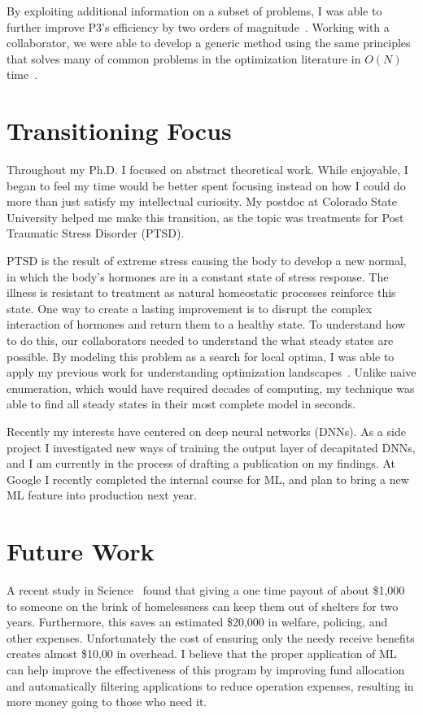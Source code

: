 \documentclass[a4paper, 11pt]{article}
\begin{document}
By exploiting additional information on a subset of problems, I was able to further
improve P3's efficiency by two orders of magnitude~\cite{goldman:2015:GBO}.
Working with a collaborator, we were able to develop a generic method using the same principles
that solves many of common problems in the optimization literature in $O(N)$ time~\cite{whitley:2016:mkl}.

\section{Transitioning Focus}
Throughout my Ph.D. I focused on abstract theoretical work. While enjoyable, I began to feel my time would be
better spent focusing instead on how I could do more than just satisfy my intellectual curiosity.
My postdoc at Colorado State University helped me make this transition, as the topic was treatments for
Post Traumatic Stress Disorder (PTSD).

PTSD is the result of extreme stress causing the body to develop a new
normal, in which the body's hormones are in a constant state of stress response. The illness is resistant
to treatment as natural homeostatic processes reinforce this state. One way to create a lasting improvement
is to disrupt the complex interaction of hormones and return them to a healthy state. To understand how to
do this, our collaborators needed to understand the what steady states are possible. By modeling this problem as a search for local optima,
I was able to apply my previous work for understanding optimization landscapes~\cite{goldman:2016:hyperplane}.
Unlike naive enumeration, which would have required decades of computing, my technique was able to find
all steady states in their most complete model in seconds.


Recently my interests have centered on deep neural networks (DNNs). As a side project I
investigated new ways of training the output layer of decapitated DNNs, and I am currently in the
process of drafting a publication on my findings. At Google I recently completed the internal course
for ML, and plan to bring a new ML feature into production next year.

\section{Future Work}
A recent study in Science~\cite{evans:2016:homelessness} found that
giving a one time payout of about \$1,000 to someone on the brink of homelessness
can keep them out of shelters for two years. Furthermore, this saves an estimated
\$20,000 in welfare, policing, and other expenses. Unfortunately the cost
of ensuring only the needy receive benefits creates almost \$10,00 in overhead.
I believe that the proper application of ML can help improve the effectiveness
of this program by improving fund allocation and automatically filtering applications
to reduce operation expenses, resulting in more money going to those who need it.
\end{document}
